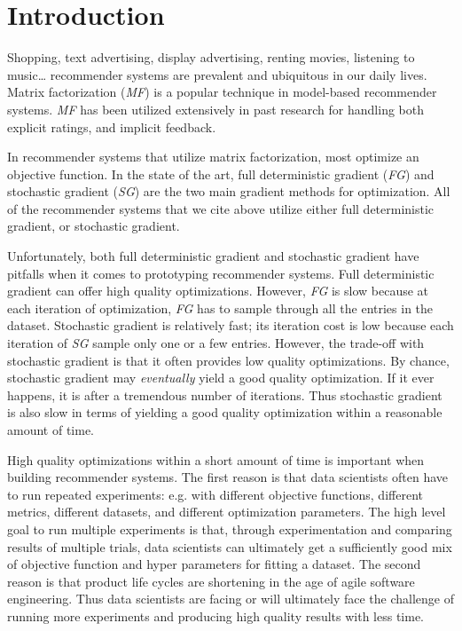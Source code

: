 \section{Introduction}
Shopping, text advertising, display advertising, renting movies, listening to music… recommender systems are prevalent and ubiquitous in our daily lives.  
Matrix factorization (\emph{MF}) is a popular technique in model-based recommender systems.  
\emph{MF} has been utilized extensively in past research for handling both explicit \cite{mmmf2005fast, mnar, gapfm} ratings, and implicit \cite{wrmf2008hu, wrmf2008pan, climf, bpr, mnar} feedback.  

In recommender systems that utilize matrix factorization, most optimize an objective function.  
In the state of the art, full deterministic gradient (\emph{FG}) and stochastic gradient (\emph{SG}) are the two main gradient methods for optimization.  
All of the recommender systems that we cite above utilize either full deterministic gradient, or stochastic gradient.

Unfortunately, both full deterministic gradient and stochastic gradient have pitfalls when it comes to prototyping recommender systems.  
Full deterministic gradient can offer high quality optimizations.  
However, \emph{FG} is slow because at each iteration of optimization, \emph{FG} has to sample through all the entries in the dataset.  
Stochastic gradient is relatively fast; its iteration cost is low because each iteration of \emph{SG} sample only one or a few entries.  
However, the trade-off with stochastic gradient is that it often provides low quality optimizations.  
By chance, stochastic gradient may \emph{eventually} yield a good quality optimization. 
If it ever happens, it is after a tremendous number of iterations.  
Thus stochastic gradient is also slow in terms of yielding a good quality optimization within a reasonable amount of time.

High quality optimizations within a short amount of time is important when building recommender systems.  
The first reason is that data scientists often have to run repeated experiments: e.g. with different objective functions, different metrics, different datasets, and different optimization parameters.  
The high level goal to run multiple experiments is that, through experimentation and comparing results of multiple trials, 
data scientists can ultimately get a sufficiently good mix of objective function and hyper parameters for fitting a dataset.  
The second reason is that product life cycles are shortening in the age of agile software engineering.  
Thus data scientists are facing or will ultimately face the challenge of running more experiments and producing high quality results with less time.  

